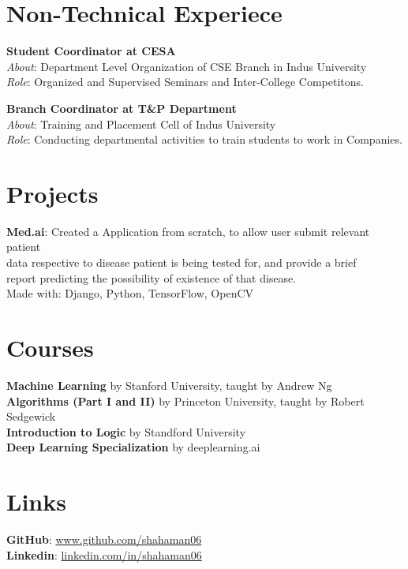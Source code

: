 \documentclass[margin, centered]{res}
\begin{document}
\begin{resume}
		\section{Non-Technical Experiece}
			\textbf{Student Coordinator at CESA}\\
			\textit{About}: Department Level Organization of CSE Branch in Indus University\\
			\textit{Role}: Organized and Supervised Seminars and Inter-College Competitons.
			\par
			\textbf{Branch Coordinator at T\&P Department}\\
			\textit{About}: Training and Placement Cell of Indus University\\
			\textit{Role}: Conducting departmental activities to train students to work in Companies.
		
		\section{Projects}
			\textbf{Med.ai}:
			Created a Application from scratch, to allow user submit relevant patient \\data respective to disease patient is being tested for, and provide a brief \\report predicting the possibility of existence of that disease.
			\\Made with: Django, Python, TensorFlow, OpenCV
		
		\section{Courses}
			\textbf{Machine Learning} by Stanford University, taught by Andrew Ng\\
			\textbf{Algorithms (Part I and II)} by Princeton University, taught by Robert Sedgewick\\
			\textbf{Introduction to Logic} by Standford University\\
			\textbf{Deep Learning Specialization} by deeplearning.ai
		
		\section{Links}
			\textbf{GitHub}: \href{https://github.com/shahaman06}{www.github.com/shahaman06}
			\\
			\textbf{Linkedin}: \href{https://www.linkedin.com/in/shahaman06/}{linkedin.com/in/shahaman06}
	\end{resume}
	
\end{document}
